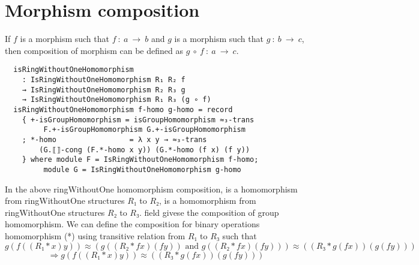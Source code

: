 \section{Morphism composition}
If $f$ is a morphism such that $f\ :\ a \ \rightarrow \ b$ and $g$ is a morphism
such that $g\ :\ b\ \rightarrow \ c$, then composition of morphism can be
defined as $g \ ∘\ f\ :\ a \ \rightarrow \ c$.
\begin{verbatim}
  isRingWithoutOneHomomorphism
    : IsRingWithoutOneHomomorphism R₁ R₂ f
    → IsRingWithoutOneHomomorphism R₂ R₃ g
    → IsRingWithoutOneHomomorphism R₁ R₃ (g ∘ f)
  isRingWithoutOneHomomorphism f-homo g-homo = record
    { +-isGroupHomomorphism = isGroupHomomorphism ≈₃-trans
		 F.+-isGroupHomomorphism G.+-isGroupHomomorphism
    ; *-homo                 = λ x y → ≈₃-trans 
		(G.⟦⟧-cong (F.*-homo x y)) (G.*-homo (f x) (f y))
    } where module F = IsRingWithoutOneHomomorphism f-homo;
		 module G = IsRingWithoutOneHomomorphism g-homo
\end{verbatim}
In the above ringWithoutOne homomorphism composition,  is a
homomorphism from ringWithoutOne structures $R₁$ to $R₂$,  is a
homomorphism from ringWithoutOne structures $R₂$ to $R₃$.
 field givese the composition of group homomorphism.
We can define the composition for binary operations homomorphism (*) using
transitive relation  from $R₁$ to $R₃$ such that \[g (f ((R₁ * x)
y)) ≈ (g ((R₂ * f x) (f y)) \text{ and } g ((R₂ * f x) (f y))) ≈ ((R₃ * g (f x))
(g (f y)))\]
\[\Rightarrow g (f ((R₁ * x) y)) ≈ ((R₃ * g (f x)) (g (f y)))\]
